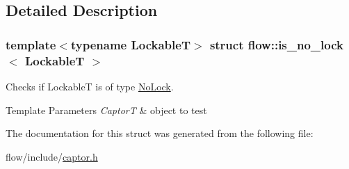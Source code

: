 \subsection{Detailed Description}
\subsubsection*{template$<$typename LockableT$>$\newline
struct flow\+::is\+\_\+no\+\_\+lock$<$ Lockable\+T $>$}

Checks if {\ttfamily LockableT} is of type \hyperlink{structflow_1_1_no_lock}{No\+Lock}. 


\begin{DoxyTemplParams}{Template Parameters}
{\em CaptorT} & object to test \\
\hline
\end{DoxyTemplParams}


The documentation for this struct was generated from the following file\+:\begin{DoxyCompactItemize}
\item 
flow/include/\hyperlink{captor_8h}{captor.\+h}\end{DoxyCompactItemize}
